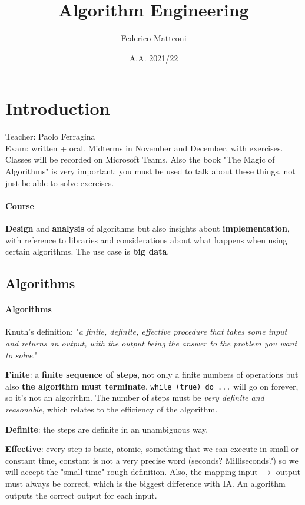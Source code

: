 \documentclass[10pt]{report}
\begin{document}
\title{Algorithm Engineering}
\author{Federico Matteoni}
\date{A.A. 2021/22}
\renewcommand*\contentsname{Index}

\maketitle
\tableofcontents
\pagebreak
\section{Introduction}
Teacher: Paolo Ferragina\\
Exam: written + oral. Midterms in November and December, with exercises.\\
Classes will be recorded on Microsoft Teams. Also the book "The Magic of Algorithms" is very important: you must be used to talk about these things, not just be able to solve exercises.
\paragraph{Course} \textbf{Design} and \textbf{analysis} of algorithms but also insights about \textbf{implementation}, with reference to libraries and considerations about what happens when using certain algorithms. The use case is \textbf{big data}.
\subsection{Algorithms} 
\paragraph{Algorithms} Knuth's definition: "\textit{a finite, definite, effective procedure that takes some input and returns an output, with the output being the answer to the problem you want to solve}."\begin{list}{}{}
	\item \textbf{Finite}: a \textbf{finite sequence of steps}, not only a finite numbers of operations but also \textbf{the algorithm must terminate}. \texttt{while (true) do ...} will go on forever, so it's not an algorithm. The number of steps must be \textit{very definite and reasonable}, which relates to the efficiency of the algorithm.
	\item \textbf{Definite}: the steps are definite in an unambiguous way.
	\item \textbf{Effective}: every step is basic, atomic, something that we can execute in small or constant time, constant is not a very precise word (seconds? Milliseconds?) so we will accept the "small time" rough definition. Also, the mapping input $\rightarrow$ output must always be correct, which is the biggest difference with IA. An algorithm outputs the correct output for each input.
\end{list}
\end{document}
